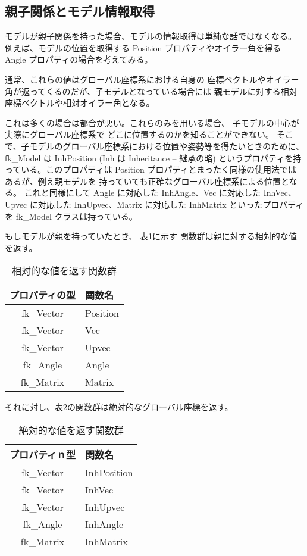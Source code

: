 \subsection{親子関係とモデル情報取得}
モデルが親子関係を持った場合、モデルの情報取得は単純な話ではなくなる。
例えば、モデルの位置を取得する Position プロパティやオイラー角を得る
Angle プロパティの場合を考えてみる。

通常、これらの値はグローバル座標系における自身の
座標ベクトルやオイラー角が返ってくるのだが、子モデルとなっている場合には
親モデルに対する相対座標ベクトルや相対オイラー角となる。

これは多くの場合は都合が悪い。これらのみを用いる場合、
子モデルの中心が実際にグローバル座標系で
どこに位置するのかを知ることができない。
そこで、子モデルのグローバル座標系における位置や姿勢等を得たいときのために、
fk\_Model は InhPosition (Inh は Inheritance -- 継承の略)
というプロパティを持っている。このプロパティは
Position プロパティとまったく同様の使用法ではあるが、例え親モデルを
持っていても正確なグローバル座標系による位置となる。
これと同様にして Angle に対応した
InhAngle、Vec に対応した InhVec、Upvec に対応した
InhUpvec、Matrix に対応した InhMatrix といったプロパティを
fk\_Model クラスは持っている。

もしモデルが親を持っていたとき、
表\ref{tbl:fkInh1}に示す
関数群は親に対する相対的な値を返す。

\begin{table}[H]
\caption{相対的な値を返す関数群}
\label{tbl:fkInh1}
\begin{center}
\begin{tabular}{|c|l|}
\hline
プロパティの型 & 関数名 \\ \hline \hline
fk\_Vector & Position \\ \hline
fk\_Vector & Vec \\ \hline
fk\_Vector & Upvec \\ \hline
fk\_Angle & Angle \\ \hline
fk\_Matrix & Matrix \\ \hline
\end{tabular}
\end{center}
\end{table}

それに対し、表\ref{tbl:fkInh2}の関数群は絶対的なグローバル座標を返す。

\begin{table}[H]
\caption{絶対的な値を返す関数群}
\label{tbl:fkInh2}
\begin{center}
\begin{tabular}{|c|l|}
\hline
プロパティｎ型 & 関数名 \\ \hline \hline
fk\_Vector & InhPosition \\ \hline
fk\_Vector & InhVec \\ \hline
fk\_Vector & InhUpvec \\ \hline
fk\_Angle & InhAngle \\ \hline
fk\_Matrix & InhMatrix \\ \hline
\end{tabular}
\end{center}
\end{table}

